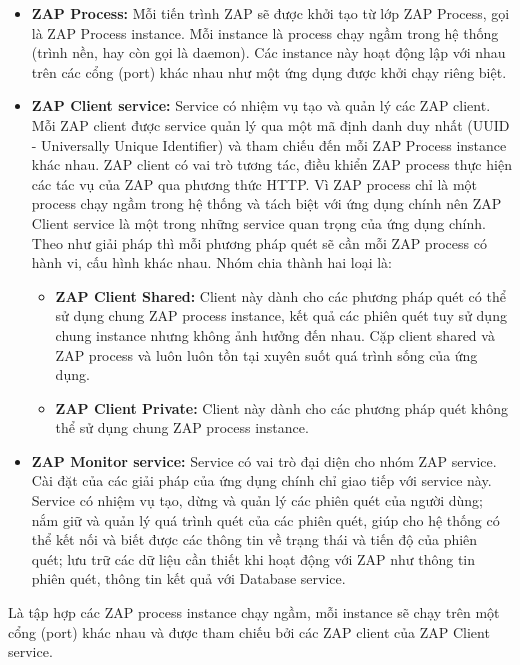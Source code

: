 \begin{itemize}
      \item \textbf{ZAP Process:} Mỗi tiến trình ZAP sẽ được khởi tạo từ lớp ZAP Process, gọi là ZAP Process instance.
            Mỗi instance là process chạy ngầm trong hệ thống (trình nền, hay còn gọi là daemon).
            Các instance này hoạt động lập với nhau trên các cổng (port) khác nhau như một ứng dụng được khởi chạy riêng biệt.
      \item \textbf{ZAP Client service:} Service có nhiệm vụ tạo và quản lý các ZAP client.
            Mỗi ZAP client được service quản lý qua một mã định danh duy nhất (UUID - Universally Unique Identifier) và tham chiếu đến mỗi ZAP Process instance khác nhau.
            ZAP client có vai trò tương tác, điều khiển ZAP process thực hiện các tác vụ của ZAP qua phương thức HTTP.
            Vì ZAP process chỉ là một process chạy ngầm trong hệ thống và tách biệt với ứng dụng chính nên ZAP Client service là một trong những service quan trọng của ứng dụng chính.
            Theo như giải pháp thì mỗi phương pháp quét sẽ cần mỗi ZAP process có hành vi, cấu hình khác nhau.
            Nhóm chia thành hai loại là:
            \begin{itemize}
                  \item \textbf{ZAP Client Shared:} Client này dành cho các phương pháp quét có thể sử dụng chung ZAP process instance, kết quả các phiên quét tuy sử dụng chung instance nhưng không ảnh hưởng đến nhau.
                        Cặp client shared và ZAP process và luôn luôn tồn tại xuyên suốt quá trình sống của ứng dụng.
                  \item \textbf{ZAP Client Private:} Client này dành cho các phương pháp quét không thể sử dụng chung ZAP process instance.
            \end{itemize}
      \item \textbf{ZAP Monitor service:} Service có vai trò đại diện cho nhóm ZAP service.
            Cài đặt của các giải pháp của ứng dụng chính chỉ giao tiếp với service này.
            Service có nhiệm vụ tạo, dừng và quản lý các phiên quét của người dùng; nắm giữ và quản lý quá trình quét của các phiên quét, giúp cho hệ thống có thể kết nối và biết được các thông tin về trạng thái và tiến độ của phiên quét; lưu trữ các dữ liệu cần thiết khi hoạt động với ZAP như thông tin phiên quét, thông tin kết quả với Database service.
\end{itemize}

\tab \tab Là tập hợp các ZAP process instance chạy ngầm, mỗi instance sẽ chạy trên một cổng (port) khác nhau và được tham chiếu bởi các ZAP client của ZAP Client service.
\par

